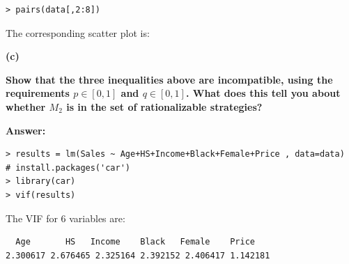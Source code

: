 \documentclass[letterpaper,11pt]{article}
\begin{document}
\begin{lstlisting}
> pairs(data[,2:8])
\end{lstlisting}

The corresponding scatter plot is:
\begin{center} 
\end{center}



\begin{addmargin}[-1.1em]{0em}
\textbf{(c)}\par\end{addmargin}
  \textbf{Show that the three inequalities above are incompatible, using the requirements $p \in [0,1]$ and $q \in [0,1]$. What does this tell you about whether $M_2$ is in the set of rationalizable strategies?}\par
\bigbreak
\begin{addmargin}[-0.5em]{0em}
\textbf{Answer: }\end{addmargin}

\begin{lstlisting}
> results = lm(Sales ~ Age+HS+Income+Black+Female+Price , data=data)
# install.packages('car')
> library(car)
> vif(results)
\end{lstlisting}
The VIF for 6 variables are:
\begin{lstlisting}
  Age       HS   Income    Black   Female    Price
2.300617 2.676465 2.325164 2.392152 2.406417 1.142181
\end{lstlisting}
\end{document}
